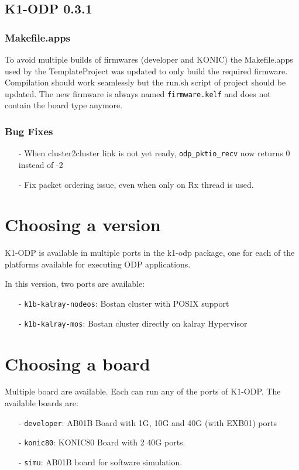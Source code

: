 \documentclass{trkalray}
\begin{document}
\subsection{K1-ODP 0.3.1}

\subsubsection{Makefile.apps}

To avoid multiple builds of firmwares (developer and KONIC) the
Makefile.apps used by the TemplateProject was updated to only build
the required firmware.
Compilation should work seamlessly but the run.sh script of project
should be updated.
The new firmware is always named \texttt{firmware.kelf} and does not
contain the board type anymore.

\subsubsection{Bug Fixes}

\begin{itemize}
\item[-]{When cluster2cluster link is not yet ready, \texttt{odp\_pktio\_recv}
now returns 0 instead of -2}
\item[-]{Fix packet ordering issue, even when only on Rx thread is used.}
\end{itemize}

\section{Choosing a version}
K1-ODP is available in multiple ports in the k1-odp package, one for
each of the platforms available for executing ODP applications.

In this version, two ports are available:
\begin{itemize}
\item[-]{\texttt{k1b-kalray-nodeos}: Bostan cluster with POSIX support}
\item[-]{\texttt{k1b-kalray-mos}: Bostan cluster directly on kalray Hypervisor}
\end{itemize}

\section{Choosing a board}

Multiple board are available. Each can run any of the ports of K1-ODP.
The available boards are:
\begin{itemize}
\item[-]{\texttt{developer}: AB01B Board with 1G, 10G and 40G (with EXB01) ports }
\item[-]{\texttt{konic80}: KONIC80 Board with 2 40G ports.}
\item[-]{\texttt{simu}: AB01B board for software simulation.}
\end{itemize}
\end{document}
